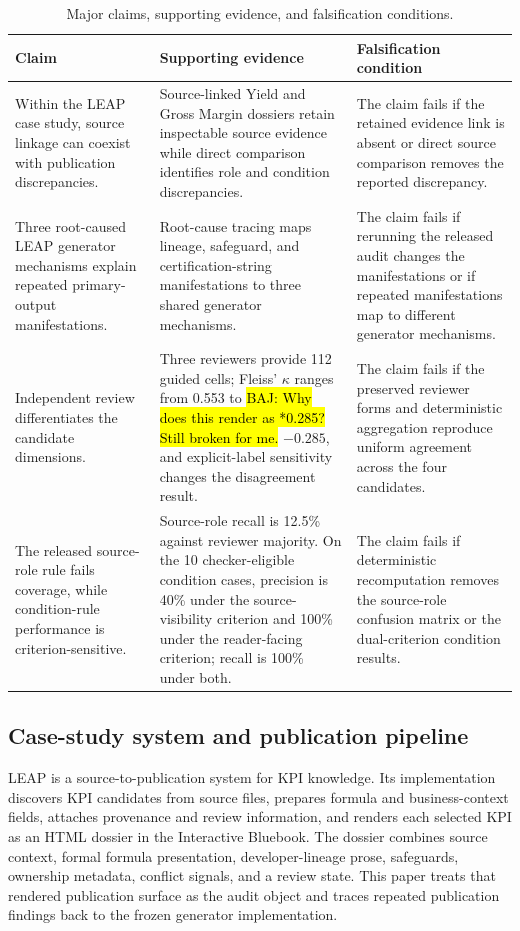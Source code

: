 \documentclass[a4paper,fleqn]{cas-dc}
\newcommand{\baj}[1]{{\sethlcolor{yellow}\hl{BAJ: #1}}}
\begin{document}
\begin{table}[t]
\centering
\caption{Major claims, supporting evidence, and falsification conditions.}
\label{tab:falsification}
\begin{tabularx}{\textwidth}{@{}p{}YY@{}}
\toprule
Claim & Supporting evidence & Falsification condition \\
\midrule
Within the LEAP case study, source linkage can coexist with publication discrepancies. & Source-linked Yield and Gross Margin dossiers retain inspectable source evidence while direct comparison identifies role and condition discrepancies. & The claim fails if the retained evidence link is absent or direct source comparison removes the reported discrepancy. \\
Three root-caused LEAP generator mechanisms explain repeated primary-output manifestations. & Root-cause tracing maps lineage, safeguard, and certification-string manifestations to three shared generator mechanisms. & The claim fails if rerunning the released audit changes the manifestations or if repeated manifestations map to different generator mechanisms. \\
Independent review differentiates the candidate dimensions. & Three reviewers provide 112 guided cells; Fleiss' $\kappa$ ranges from 0.553 to \baj{Why does this render as *0.285? Still broken for me.} $-0.285$, and explicit-label sensitivity changes the disagreement result. & The claim fails if the preserved reviewer forms and deterministic aggregation reproduce uniform agreement across the four candidates. \\
The released source-role rule fails coverage, while condition-rule performance is criterion-sensitive. & Source-role recall is 12.5\% against reviewer majority. On the 10 checker-eligible condition cases, precision is 40\% under the source-visibility criterion and 100\% under the reader-facing criterion; recall is 100\% under both. & The claim fails if deterministic recomputation removes the source-role confusion matrix or the dual-criterion condition results. \\
\bottomrule
\end{tabularx}
\end{table}

\subsection{Case-study system and publication pipeline}
LEAP is a source-to-publication system for KPI knowledge. Its implementation discovers KPI candidates from source files, prepares formula and business-context fields, attaches provenance and review information, and renders each selected KPI as an HTML dossier in the Interactive Bluebook. The dossier combines source context, formal formula presentation, developer-lineage prose, safeguards, ownership metadata, conflict signals, and a review state. This paper treats that rendered publication surface as the audit object and traces repeated publication findings back to the frozen generator implementation.
\end{document}

